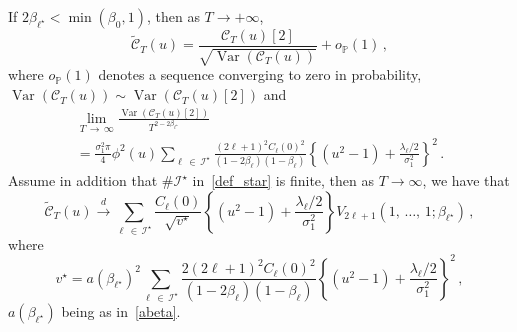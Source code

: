 \documentclass[AHL,Unicode,longabstracts,published]{cedram}
\newcommand{\clI}{\mathcal{I}}
\newcommand{\clC}{\mathcal{C}}
\newcommand{\bbP}{\mathbb{P}}
\DeclareMathOperator{\Var}{Var}
\begin{document}
\begin{theo}\label{main-theorem}
If $2\beta_{\ell^\star}<\min(\beta_0,1)$, then as $T\to +\infty$,
\begin{equation}\label{caos2dom}
\widetilde{\clC}_{T}(u) =\frac{\clC_{T}(u)[2]}{\sqrt{
\Var\left (\clC_{T}(u)\right) }}+o_{\bbP}(1)\,,
\end{equation}
where $o_{\bbP}(1)$ denotes a sequence converging to zero in probability, $\Var\left(\clC_{T}(u)\right) \sim
\Var\left(\clC_{T}(u)[2]\right)$ and
\begin{multline}\label{asymp_var}
\lim_{T\,\rightarrow\,\infty }\frac{\Var\left(\clC _{T}(u)[2]\right)}{T^{2-2\beta _{\ell^{\star}}}}\\
=\frac{\sigma _{1}^{2}\pi }{4}\phi^{2}(u)\sum_{\ell\,\in\,\clI^\star}\frac{(2\ell+1)^{2}C_
\ell(0)^2}{(1-2\beta_\ell)(1-\beta_\ell)}\left\{\left(u^{2}-1\right)+\frac{\lambda _{\ell}/2}{\sigma_{1}^{2}}\right\}^2\,.
\end{multline}
Assume in addition that $\# \clI^\star$ in~\eqref{def_star} is finite, then as $T\to \infty $, we have that
\begin{equation*}
\widetilde{\clC}_{T}(u)\overset{d}{\longrightarrow}\sum_{\ell\,\in\,\clI^\star} \frac{C_\ell(0)}{\sqrt{v^\star}}\left\{\left(u^{2}-1\right)+\frac{\lambda _{\ell}/2}{\sigma_{1}^{2}}\right\}V_{2\ell+1}\left(1,\,\dots,\,1;\beta_{\ell^\star}\right)\,,
\end{equation*}
where
\begin{equation*}
v^\star=a\left(\beta_{\ell^\star}\right)^2 \sum_{\ell\,\in\,\clI^\star} \frac{2(2\ell+1)^{2} C_\ell(0)^2}{(1-2\beta_\ell)(1-\beta_\ell)} \left\{ \left(u^{2}-1\right)+\frac{\lambda _{\ell}/2}{\sigma_{1}^{2}}\right\}^2\,,
\end{equation*}
$a(\beta_{\ell^\star})$ being as in~\eqref{abeta}.
\end{theo}
\end{document}
